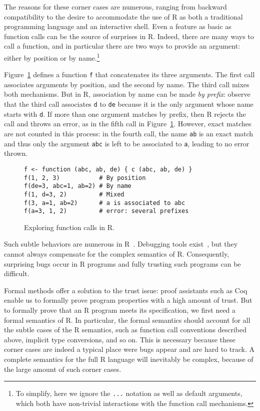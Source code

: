 \documentclass[
    sigplan,
    10pt,
    review, %
    natbib=false %
 ]{acmart}
\newcommand\et[1]{\todo[color=blue!20,size=\scriptsize]{#1}}
\begin{document}
The reasons for these corner cases are numerous, ranging from backward compatibility to the desire to accommodate the use of R as both a traditional programming language and an interactive shell.
Even a feature as basic as function calls can be the source of surprises in R. 
Indeed, there are many ways to call a function, and in particular there are two ways to provide an argument: either by position or by name.\footnote{
    To simplify, here we ignore the \texttt{...} notation
    as well as default arguments, which both have non-trivial interactions with the function call mechanisms.}

Figure~\ref{fig:calls} defines a function \texttt{f} that concatenates its three arguments. The first call associates arguments by position, and the second by name. The third call mixes both mechanisms. But in R, 
association by name can be made {\em by prefix}:
observe that the third call associates \texttt{d} to \texttt{de}
because it is the only argument whose name starts with \texttt{d}.
If more than one argument matches by prefix,
then R rejects the call and throws an error,
as in the fifth call in Figure~\ref{fig:calls}.
However, exact matches are not counted in this process:
in the fourth call,
the name \texttt{ab} is an exact match
and thus only the argument \texttt{abc}
is left to be associated to \texttt{a},
leading to no error thrown.

\begin{figure}[t]
\begin{verbatim}
f <- function (abc, ab, de) { c (abc, ab, de) }
f(1, 2, 3)           # By position
f(de=3, abc=1, ab=2) # By name
f(1, d=3, 2)         # Mixed
f(3, a=1, ab=2)      # a is associated to abc
f(a=3, 1, 2)         # error: several prefixes
\end{verbatim}
\caption{Exploring function calls in R.}
\label{fig:calls}
\end{figure}

Such subtle behaviors are numerous in R~\parencite{RInferno}.
Debugging tools exist~\parencite{mcpherson2014},
but they cannot always compensate for the complex semantics of R.
Consequently, surprising bugs occur in R programs
and fully trusting such programs can be difficult.

Formal methods offer a solution to the trust issue:
proof assistants such as Coq~\parencite{Coq} enable us
to formally prove program properties with a high amount of trust.
But to formally prove that an R program meets its specification,
we first need a formal semantics of R. \et{mention the on-going spec effort and its limits} 
In particular, the formal semantics should account for all the subtle cases of the R semantics, such as function call conventions described above, implicit type conversions, and so on.
This is necessary because these corner cases are indeed a typical place were bugs appear and are hard to track. 
A complete semantics for the full R language will inevitably be complex,
because of the large amount of such corner cases.
\end{document}
